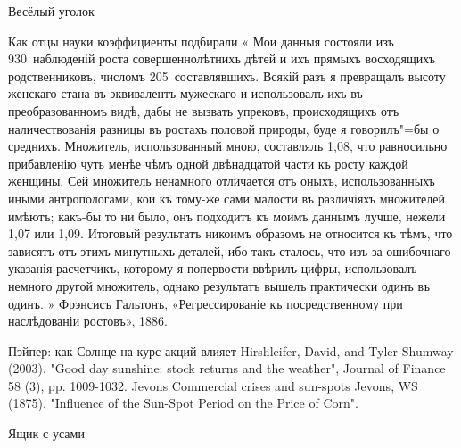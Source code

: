 Весёлый уголок

Как отцы науки коэффициенты подбирали
«
Мои данныя состояли изъ 930~наблюденій роста совершеннолѣтнихъ дѣтей и ихъ прямыхъ восходящихъ родственниковъ, числомъ 205~составлявшихъ. Всякій разъ я превращалъ высоту женскаго стана въ эквивалентъ мужескаго и использовалъ ихъ въ преобразованномъ видѣ, дабы не вызвать упрековъ, происходящихъ отъ наличествованія разницы въ ростахъ половой природы, буде я говорилъ"=бы о среднихъ. Множитель, использованный мною, составлялъ 1,08, что равносильно прибавленію чуть менѣе чѣмъ одной двѣнадцатой части къ росту каждой женщины. Сей множитель ненамного отличается отъ оныхъ, использованныхъ иными антропологами, кои къ тому-же сами малости въ различіяхъ множителей имѣютъ; какъ-бы то ни было, онъ подходитъ къ моимъ даннымъ лучше, нежели 1,07 или 1,09. Итоговый результатъ никоимъ образомъ не относится къ тѣмъ, что зависятъ отъ этихъ минутныхъ деталей, ибо такъ сталось, что изъ-за ошибочнаго указанія расчетчикъ, которому я попервости ввѣрилъ цифры, использовалъ немного другой множитель, однако результатъ вышелъ практически одинъ въ одинъ. 
»
Фрэнсисъ Гальтонъ, «Регрессированіе къ посредственному при наслѣдованіи ростовъ», 1886.

Пэйпер: как Солнце на курс акций влияет
Hirshleifer, David, and Tyler Shumway (2003). "Good day sunshine: stock returns and the weather", Journal of Finance 58 (3), pp. 1009-1032.
Jevons Commercial crises and sun-spots
 Jevons, WS (1875). "Influence of the Sun-Spot Period on the Price of Corn".

Ящик с усами
